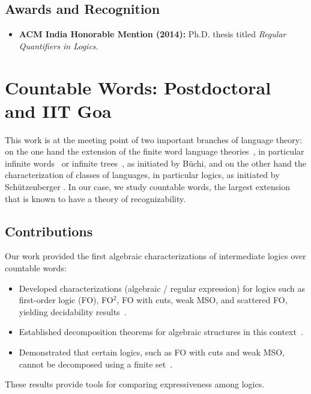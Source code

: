\documentclass[11pt,a4paper,sans]{moderncv} %
\begin{document}
\subsection{Awards and Recognition}
\begin{itemize}
    \item \textbf{ACM India Honorable Mention (2014):} Ph.D. thesis titled \emph{Regular Quantifiers in Logics}.
\end{itemize}

\section{Countable Words: Postdoctoral and IIT Goa}
This work is at the meeting point of two important branches of language theory: on the one hand the extension of the finite word language theories~\cite{Kleene56,RabinScott59}, in particular infinite words~\cite{Buchi62} or infinite trees~\cite{Rabin69}, as initiated by Büchi, and on the other hand the characterization of classes of languages, in particular logics, as initiated by Schützenberger \cite{Schutzenberger65}.
In our case, we study countable words, the largest extension that is known to have a theory of recognizability.

\subsection{Contributions}
Our work provided the first algebraic characterizations of intermediate logics over countable words:
\begin{itemize}
    \item Developed characterizations (algebraic / regular expression) for logics such as first-order logic (\textsf{FO}), \textsf{FO}$^2$, \textsf{FO} with cuts, weak \textsf{MSO}, and scattered \textsf{FO}, yielding decidability results~\cite{icalp15,ms16}.
    \item Established decomposition theorems for algebraic structures in this context~\cite{lics19,jcss23}.
    \item Demonstrated that certain logics, such as \textsf{FO} with cuts and weak \textsf{MSO}, cannot be decomposed using a finite set~\cite{fct21}.
\end{itemize}
These results provide tools for comparing expressiveness among logics.
\end{document}

